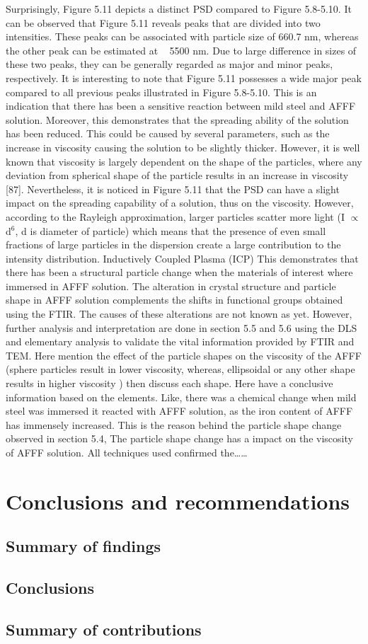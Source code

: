 \documentclass[12pt]{report}
\begin{document}

Surprisingly, Figure 5.11 depicts a distinct PSD compared to Figure 5.8-5.10. It can be observed that Figure 5.11 reveals peaks that are divided into two intensities. These peaks can be associated with particle size of 660.7 nm, whereas the other peak can be estimated at ~ 5500 nm.  Due to large difference in sizes of these two peaks, they can be generally regarded as major and minor peaks, respectively.  It is interesting to note that Figure 5.11 possesses a wide major peak compared to all previous peaks illustrated in Figure 5.8-5.10. This is an indication that there has been a sensitive reaction between mild steel and AFFF solution. Moreover, this demonstrates that the spreading ability of the solution has been reduced. This could be caused by several parameters, such as the increase in viscosity causing the solution to be slightly thicker. However, it is well known that viscosity is largely dependent on the shape of the particles, where any deviation from spherical shape of the particle results in an increase in viscosity [87]. Nevertheless, it is noticed in Figure 5.11 that the PSD can have a slight impact on the spreading capability of a solution, thus on the viscosity.
However, according to the Rayleigh approximation, larger particles scatter more light (I $\propto$d$^6$, d is diameter of particle) which means that the presence of even small fractions of large particles in the dispersion create a large contribution to the intensity distribution.
Inductively Coupled Plasma (ICP) 
This demonstrates that there has been a structural particle change when the materials of interest where immersed in AFFF solution. The alteration in crystal structure and particle shape in AFFF solution complements the shifts in functional groups obtained using the FTIR. The causes of these alterations are not known as yet. However, further analysis and interpretation are done in section 5.5 and 5.6 using the DLS and elementary analysis to validate the vital information provided by FTIR and TEM.
Here mention the effect of the particle shapes on the viscosity of the AFFF (sphere particles result in lower viscosity, whereas, ellipsoidal or any other shape results in higher viscosity ) then discuss each shape.  
Here have a conclusive information based on the elements. Like, there was a chemical change when mild steel was immersed it reacted with AFFF solution, as the iron content of AFFF has immensely increased. This is the reason behind the particle shape change observed in section 5.4, The particle shape change has a impact on the viscosity of AFFF solution. 
All techniques used confirmed the……
  
\chapter{Conclusions and recommendations}
\section{Summary of findings}
\section{Conclusions}
\section{Summary of contributions}
\end{document}
